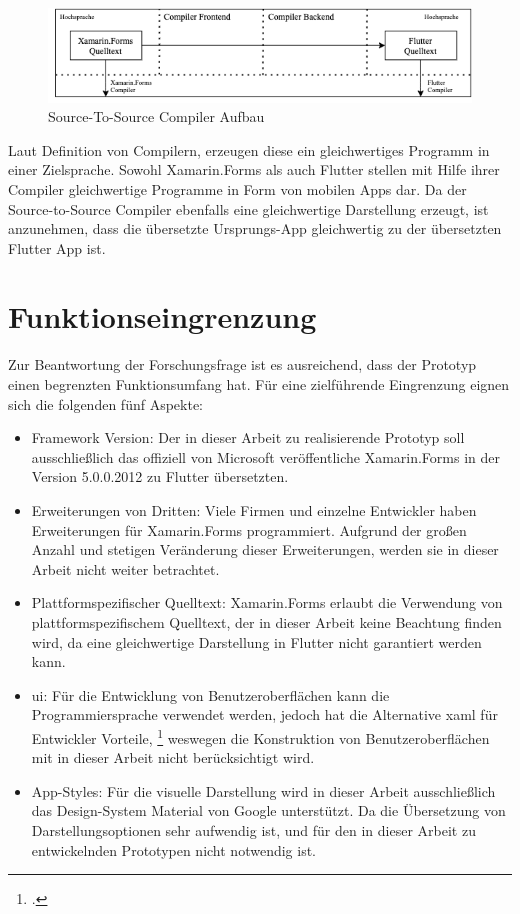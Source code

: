 \begin{figure}[!ht]
 \includegraphics[width=\textwidth,keepaspectratio]{Images/CompilerArchitecture/S2SArchitecture.png}
 \caption{Source-To-Source Compiler Aufbau}
 \label{fig:S2SCompilerAufbau}
\end{figure}

Laut Definition von Compilern, erzeugen diese ein gleichwertiges Programm in einer Zielsprache.  Sowohl Xamarin.Forms als auch Flutter stellen mit Hilfe ihrer Compiler gleichwertige Programme in Form von mobilen Apps dar.  Da der Source-to-Source Compiler ebenfalls eine gleichwertige Darstellung erzeugt, ist anzunehmen, dass die übersetzte Ursprungs-App gleichwertig zu der übersetzten Flutter App ist. 

\section{Funktionseingrenzung}
Zur Beantwortung der Forschungsfrage ist es ausreichend, dass der Prototyp einen begrenzten Funktionsumfang hat.  Für eine zielführende Eingrenzung eignen sich die folgenden fünf Aspekte:

\begin{itemize}
\setlength\itemsep{-0.6em}
 \item Framework Version: Der in dieser Arbeit zu realisierende Prototyp soll ausschließlich das offiziell von Microsoft veröffentliche Xamarin.Forms in der Version 5.0.0.2012 zu Flutter übersetzten.  
 \item Erweiterungen von Dritten: Viele Firmen und einzelne Entwickler haben Erweiterungen für Xamarin.Forms programmiert.  Aufgrund der großen Anzahl und stetigen Veränderung dieser Erweiterungen, werden sie in dieser Arbeit nicht weiter betrachtet.  
 \item Plattformspezifischer Quelltext: Xamarin.Forms erlaubt die Verwendung von plattformspezifischem Quelltext,  der in dieser Arbeit keine Beachtung finden wird, da eine gleichwertige Darstellung in Flutter nicht garantiert werden kann. 
  \item \ac{ui}: Für die Entwicklung von Benutzeroberflächen kann die Programmiersprache \Csharp{} verwendet werden,  jedoch hat die Alternative \ac{xaml} für Entwickler Vorteile, \footcite[Vgl.][Abgerufen am \today]{MicrosoftXAML2017} weswegen die Konstruktion von Benutzeroberflächen mit \Csharp{} in dieser Arbeit nicht berücksichtigt wird.  
  \item App-Styles: Für die visuelle Darstellung wird in dieser Arbeit ausschließlich das Design-System Material von Google unterstützt.  Da die Übersetzung von Darstellungsoptionen sehr aufwendig ist,  und für den in dieser Arbeit zu entwickelnden Prototypen nicht notwendig ist.  
\end{itemize}

